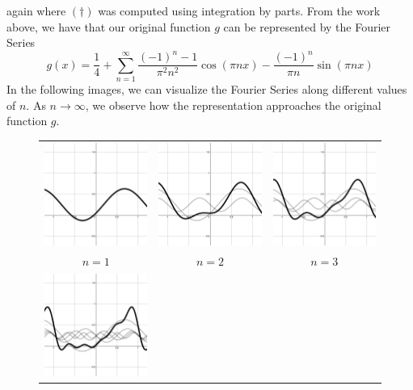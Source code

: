 \documentclass[11pt]{amsart}
\theoremstyle{plain}
\theoremstyle{definition}
\begin{document}
again where $(\dagger)$ was computed using integration by parts. From the work above, we have that our original function $g$ can be represented by the Fourier Series $$g(x) =\dfrac{1}{4} + \sum_{n=1}^\infty \dfrac{(-1)^n-1}{\pi^2 n^2}\cos(\pi nx) - \dfrac{(-1)^n}{\pi n}\sin(\pi nx)$$
In the following images, we can visualize the Fourier Series along different values of $n$. As $n\to\infty$, we observe how the representation approaches the original function $g$. 
\begin{figure}[ht!]
\centering
\begin{tabular}{ccc}
  \includegraphics[width=40mm]{Images/complex_1.png} &
  \includegraphics[width=40mm]{Images/complex_2.png} &
  \includegraphics[width=40mm]{Images/complex_3.png} \\
  $n=1$ & $n=2$ & $n=3$\\[6pt]
  \includegraphics[width=40mm]{Images/complex_5.png} &

\end{tabular}
\end{figure}
\end{document}
